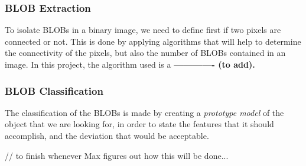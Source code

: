 \subsubsection{BLOB Extraction}
To isolate BLOBs in a binary image, we need to define first if two pixels are connected or not. This is done by applying algorithms that will help to determine the connectivity of the pixels, but also the number of BLOBs contained in an image.
In this project, the algorithm used is a \textbf{------------- (to add).}
\subsubsection{BLOB Classification}
The classification of the BLOBs is made by creating a \textit{prototype model} of the object that we are looking for, in order to state the features that it should accomplish, and the deviation that would be acceptable.

// to finish whenever Max figures out how this will be done...
